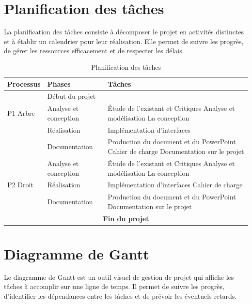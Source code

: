 \section{Planification des tâches}
La planification des tâches consiste à décomposer le projet en activités
distinctes et à établir un calendrier pour leur réalisation. Elle permet de
suivre les progrès, de gérer les ressources efficacement et de
respecter les délais.

\begin{table}[H]
  \centering
  \begin{tabularx}{\textwidth}{|l|l|X|}
    \hline
    \textbf{Processus} & \textbf{Phases} & \textbf{Tâches} \\ \hline
    \multirow{3}{*}{P1 Arbre} & Début du projet & \\ \cline{2-3}
    & Analyse et conception & Étude de l'existant et Critiques \newline Analyse et modélisation \newline La conception \\ \cline{2-3}
    & Réalisation & Implémentation d'interfaces \\ \cline{2-3}
    & Documentation & Production du document et du PowerPoint \newline Cahier de charge \newline Documentation sur le projet \\ \hline
    \multirow{3}{*}{P2 Droit} & Analyse et conception & Étude de l'existant et Critiques \newline Analyse et modélisation \newline La conception \\ \cline{2-3}
    & Réalisation & Implémentation d'interfaces \newline Cahier de charge \\ \cline{2-3}
    & Documentation & Production du document et du PowerPoint \newline Documentation sur le projet \\ \hline
    \multicolumn{3}{|c|}{\textbf{Fin du projet}}  \\ \hline
  \end{tabularx}
  \caption{Planification des tâches}
\end{table}


\section{Diagramme de Gantt}
Le diagramme de Gantt est un outil visuel de gestion de projet qui affiche les
tâches à accomplir sur une ligne de temps. Il permet de suivre les progrès,
d’identifier les dépendances entre les tâches et de prévoir les éventuels retards.

